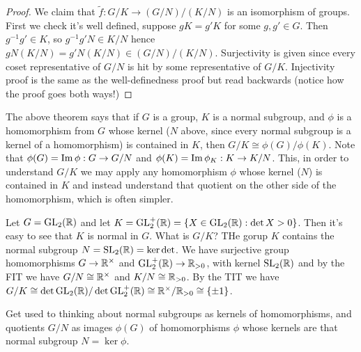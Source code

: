 \begin{proof}


  We claim that  $\widetilde{f}: G/K \to (G/N)/(K/N)$ is an isomorphism of groups.
  First we check it's well defined, suppose $gK=g'K$ for some $g,g'\in G$. Then
  $g^{-1}g'\in K$, so $g^{-1}g' N \in K/N$ hence $gN(K/N) = g'N(K/N)\in (G/N)/(K/N)$.
  Surjectivity is given since every coset representative of $G/N$ is hit by some
  representative of $G/K$. Injectivity proof is the same as the well-definedness proof but
  read backwards (notice how the proof goes both ways!)
\end{proof}
The above theorem says that if $G$ is a group, $K$ is a normal subgroup, and $\phi$ is a
homomorphism from $G$ whose kernel ($N$ above, since every normal subgroup is a kernel of
a homomorphism) is contained in $K$, then $G/K \cong \phi(G)/\phi(K)$. Note that
$\phi(G)=\operatorname{Im} \phi:G\to G/N$ and $\phi(K)=\operatorname{Im} \phi_{K}:K\to K/N$. This, in order to
understand $G/K$ we may apply any homomorphism $\phi$ whose kernel ($N$) is contained in
$K$ and instead understand that quotient on the other side of the homomorphism, which is
often simpler.

\begin{example}
  Let $G=\operatorname{GL}_{2}(\mathbb R)$ and let $K=\operatorname{GL}_2^+(\mathbb R)=\{X\in\operatorname{GL}_2(\mathbb R) : \det X>0\}$. Then it's
  easy to see that $K$ is normal in $G$. What is $G/K$? THe gorup $K$ contains the normal
  subgroup $N=\operatorname{SL}_2(\mathbb R)=\ker\det$. We have surjective group homomorphisms
  $G\to\mathbb R^{\times}$ and $\operatorname{GL}_2^+(\mathbb R)\to\mathbb R_{>0}$, with kernel $\operatorname{SL}_2(\mathbb R)$ and by the
  FIT we have $G/N\cong \mathbb R^{\times}$ and $K/N\cong \mathbb R_{>0}$. By the TIT we have
  $G/K\cong \det\operatorname{GL}_2(\mathbb R)/\det\operatorname{GL}_2^+(\mathbb R)\cong \mathbb R^{\times}/\mathbb R_{>0}\cong \{\pm 1\}$.
\end{example}

Get used to thinking about normal subgroups as kernels of homomorphisms, and quotients
$G/N$ as images $\phi(G)$ of homomorphisms $\phi$ whose kernels are that normal subgroup
$N=\ker\phi$.
